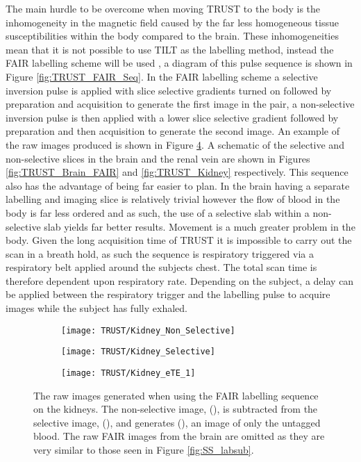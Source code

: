 The main hurdle to be overcome when moving \ac{TRUST} to the body is the inhomogeneity in the magnetic field caused by the far less homogeneous tissue susceptibilities within the body compared to the brain. These inhomogeneities mean that it is not possible to use \ac{TILT} as the labelling method, instead the \ac{FAIR} labelling scheme will be used \cite{martirosian_fair_2004}, a diagram of this pulse sequence is shown in Figure \ref{fig:TRUST_FAIR_Seq}. In the \ac{FAIR} labelling scheme a selective inversion pulse is applied with slice selective gradients turned on followed by \ttwo preparation and acquisition to generate the first image in the pair, a non-selective inversion pulse is then applied with a lower slice selective gradient followed by \ttwo preparation and then acquisition to generate the second image. An example of the raw images produced is shown in Figure \ref{fig:RV_labsub}. A schematic of the selective and non-selective slices in the brain and the renal vein are shown in Figures \ref{fig:TRUST_Brain_FAIR} and \ref{fig:TRUST_Kidney} respectively. This sequence also has the advantage of being far easier to plan. In the brain having a separate labelling and imaging slice is relatively trivial however the flow of blood in the body is far less ordered and as such, the use of a selective slab within a non-selective slab yields far better results. Movement is a much greater problem in the body. Given the long acquisition time of \ac{TRUST} it is impossible to carry out the scan in a breath hold, as such the sequence is respiratory triggered via a respiratory belt applied around the subjects chest. The total scan time is therefore dependent upon respiratory rate. Depending on the subject, a delay can be applied between the respiratory trigger and the labelling pulse to acquire images while the subject has fully exhaled.

\begin{figure}[H]
	\centering
	\begin{subfigure}[c]{0.30\textwidth}
		\centering
		\texttt{[image: TRUST/Kidney\_Non\_Selective]}
		\caption{}
		\label{fig:RV_nonsel}
	\end{subfigure}
	\hfill
	\begin{subfigure}[c]{0.30\textwidth}
		\centering
		\texttt{[image: TRUST/Kidney\_Selective]}
		\caption{}
		\label{fig:RV_sel}
	\end{subfigure}
	\hfill
	\begin{subfigure}[c]{0.30\textwidth}
		\centering
		\texttt{[image: TRUST/Kidney\_eTE\_1]}
		\caption{}
		\label{fig:RV_diff}
	\end{subfigure}
	\caption{The raw images generated when using the \ac{FAIR} labelling sequence on the kidneys. The non-selective image, (), is subtracted from the selective image, (), and generates (), an image of only the untagged blood. The raw \ac{FAIR} images from the brain are omitted as they are very similar to those seen in Figure \ref{fig:SS_labsub}.}
	\label{fig:RV_labsub}
\end{figure}

